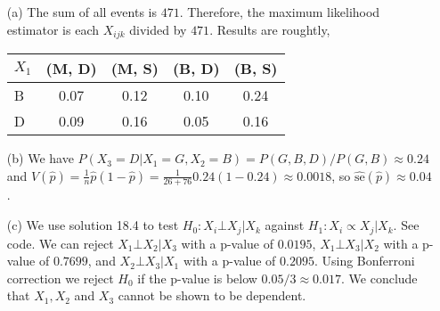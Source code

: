 \begin{itemize}
    \item[(a)] The sum of all events is $471$.
        Therefore, the maximum likelihood estimator is each $X_{ijk}$ divided by $471$.
        Results are roughtly,
        \begin{table}[H]
            \centering
            \begin{tabular}{l||c|c|c|c}
                $X_1$ & (M, D) & (M, S) & (B, D) & (B, S) \\ \hline \hline
                B     & 0.07   & 0.12   & 0.10   & 0.24   \\ \hline
                D     & 0.09   & 0.16   & 0.05   & 0.16   \\ \hline
            \end{tabular}
        \end{table}
    \item[(b)] We have $P(X_3 = D | X_1 = G, X_2 = B) = P(G, B, D) / P(G, B) \approx 0.24$ and $V(\hat{p}) = \frac{1}{n} \hat{p}(1 - \hat{p}) = \frac{1}{26 + 76} 0.24 (1 - 0.24) \approx 0.0018$, so $\hat{\mathrm{se}}(\hat{p}) \approx 0.04$.
    \item[(c)] We use solution 18.4 to test $H_0: X_i \bot X_j | X_k$ against $H_1: X_i \propto X_j | X_k$.
        See code.
        We can reject $X_1 \bot X_2 | X_3$ with a p-value of $0.0195$, $X_1 \bot X_3 | X_2$ with a p-value of $0.7699$, and $X_2 \bot X_3 | X_1$ with a p-value of $0.2095$.
        Using Bonferroni correction we reject $H_0$ if the p-value is below $0.05 / 3 \approx 0.017$.
        We conclude that $X_1, X_2$ and $X_3$ cannot be shown to be dependent.
\end{itemize}
